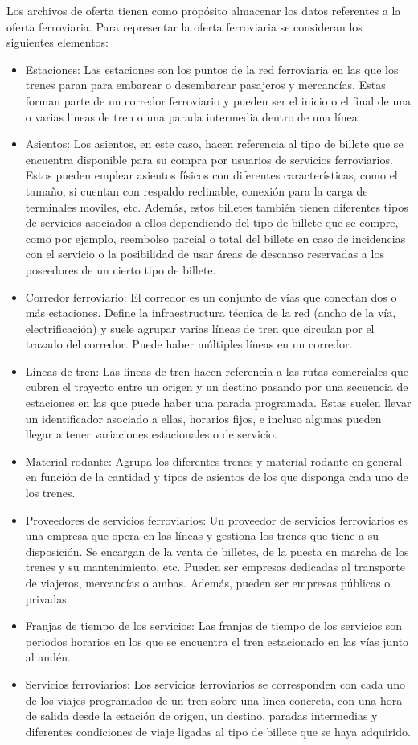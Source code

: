 Los archivos de oferta tienen como propósito almacenar los datos referentes a la oferta ferroviaria. Para representar la oferta ferroviaria se consideran los siguientes elementos:
\begin{itemize}
    \item Estaciones: Las estaciones son los puntos de la red ferroviaria en las que los trenes paran para embarcar o desembarcar pasajeros y mercancías. Estas forman parte de un corredor ferroviario y pueden ser el inicio o el final de una o varias lineas de tren o una parada intermedia dentro de una línea.
    \item Asientos: Los asientos, en este caso, hacen referencia al tipo de billete que se encuentra disponible para su compra por usuarios de servicios ferroviarios. Estos pueden emplear asientos físicos con diferentes características, como el tamaño, si cuentan con respaldo reclinable, conexión para la carga de terminales moviles, etc. Además, estos billetes también tienen diferentes tipos de servicios asociados a ellos dependiendo del tipo de billete que se compre, como por ejemplo, reembolso parcial o total del billete en caso de incidencias con el servicio o la posibilidad de usar áreas de descanso reservadas a los poseedores de un cierto tipo de billete.
    \item Corredor ferroviario: El corredor es un conjunto de vías que conectan dos o más estaciones. Define la infraestructura técnica de la red (ancho de la vía, electrificación) y suele agrupar varias líneas de tren que circulan por el trazado del corredor. Puede haber múltiples líneas en un corredor.
    \item Líneas de tren: Las líneas de tren hacen referencia a las rutas comerciales que cubren el trayecto entre un origen y un destino pasando por una secuencia de estaciones en las que puede haber una parada programada. Estas suelen llevar un identificador asociado a ellas, horarios fijos, e incluso algunas pueden llegar a tener variaciones estacionales o de servicio.
    \item Material rodante: Agrupa los diferentes trenes y material rodante en general en función de la cantidad y tipos de asientos de los que disponga cada uno de los trenes.
    \item Proveedores de servicios ferroviarios: Un proveedor de servicios ferroviarios es una empresa que opera en las líneas y gestiona los trenes que tiene a su disposición. Se encargan de la venta de billetes, de la puesta en marcha de los trenes y su mantenimiento, etc. Pueden ser empresas dedicadas al transporte de viajeros, mercancías o ambas. Además, pueden ser empresas públicas o privadas.
    \item Franjas de tiempo de los servicios: Las franjas de tiempo de los servicios son periodos horarios en los que se encuentra el tren estacionado en las vías junto al andén.
    \item Servicios ferroviarios: Los servicios ferroviarios se corresponden con cada uno de los viajes programados de un tren sobre una linea concreta, con una hora de salida desde la estación de origen, un destino, paradas intermedias y diferentes condiciones de viaje ligadas al tipo de billete que se haya adquirido.
\end{itemize}

